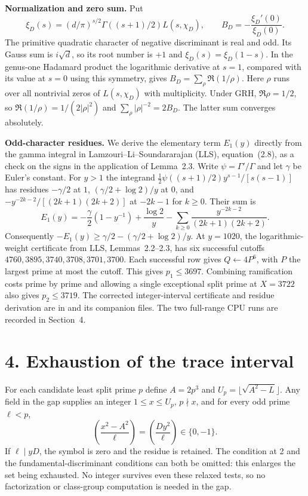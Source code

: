 \documentclass[11pt,letterpaper]{article}
\newcommand{\file}[1]{\texttt{\detokenize{#1}}}
\begin{document}
\textbf{Normalization and zero sum.}
Put
\[
 \xi_D(s)=(d/\pi)^{s/2}\Gamma((s+1)/2)L(s,\chi_D),\qquad
 B_D=-\frac{\xi_D'(0)}{\xi_D(0)} .
\]
The primitive quadratic character of negative discriminant is real and
odd. Its Gauss sum is \(i\sqrt d\), so its root number is \(+1\) and
\(\xi_D(s)=\xi_D(1-s)\). In the genus-one Hadamard product the logarithmic
derivative at \(s=1\), compared with its value at \(s=0\) using this
symmetry, gives \(B_D=\sum_\rho\Re(1/\rho)\). Here \(\rho\) runs over
all nontrivial zeros of \(L(s,\chi_D)\) with multiplicity. Under GRH,
\(\Re\rho=1/2\), so \(\Re(1/\rho)=1/(2|\rho|^2)\) and
\(\sum_\rho|\rho|^{-2}=2B_D\). The latter sum converges absolutely.

\textbf{Odd-character residues.}
We derive the elementary term \(E_1(y)\) directly from the gamma integral
in Lamzouri--Li--Soundararajan (LLS), equation~(2.8), as a check on the
signs in the application of Lemma~2.3. Write \(\psi=\Gamma'/\Gamma\)
and let \(\gamma\) be Euler's constant. For \(y>1\) the integrand
\(\frac12\psi((s+1)/2)y^{s-1}/[s(s-1)]\) has residues
\(-\gamma/2\) at \(1\), \((\gamma/2+\log2)/y\) at \(0\), and
\(-y^{-2k-2}/[(2k+1)(2k+2)]\) at \(-2k-1\) for \(k\ge0\).
Their sum is
\[
 E_1(y)=-\frac{\gamma}{2}(1-y^{-1})+\frac{\log2}{y}
        -\sum_{k\ge0}\frac{y^{-2k-2}}{(2k+1)(2k+2)} .
\]
Consequently \(-E_1(y)\ge\gamma/2-(\gamma/2+\log2)/y\).
At \(y=1020\), the logarithmic-weight certificate from LLS,
Lemmas~2.2--2.3, has six successful cutoffs
\(4760,3895,3740,3708,3701,3700\).
Each successful row gives \(Q\gets4P^6\), with \(P\) the largest prime at
most the cutoff. This gives \(p_1\le3697\). Combining ramification costs
prime by prime and allowing a single exceptional split prime at \(X=3722\)
also gives \(p_2\le3719\). The corrected integer-interval certificate and
residue derivation are in \file{split_bound_proof.md} and its companion files.
The two full-range CPU runs are recorded in Section~4.

\newpage
\section*{4. Exhaustion of the trace interval}
For each candidate least split prime \(p\) define \(A=2p^3\) and
\(U_p=\lfloor\sqrt{A^2-L}\rfloor\). Any field in the gap supplies an integer
\(1\le x\le U_p\), \(p\nmid x\), and for every odd prime \(\ell<p\),
\[
 \left(\frac{x^2-A^2}{\ell}\right)
 =\left(\frac{D y^2}{\ell}\right)\in\{0,-1\}.
\]
If \(\ell\mid yD\), the symbol is zero and the residue is retained.
The condition at 2 and the fundamental-discriminant conditions can both be
omitted: this enlarges the set being exhausted. No integer survives even
these relaxed tests, so no factorization or class-group computation is
needed in the gap.
\end{document}
